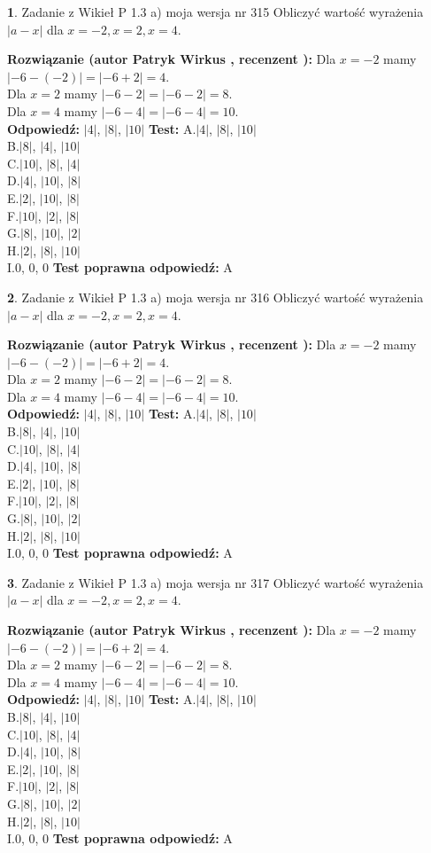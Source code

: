 \documentclass[12pt, a4paper]{article}
\theoremstyle{definition} %
\newtheorem{zad}{}
\newcommand{\zadStart}[1]{\begin{zad}#1\newline}
\newcommand{\zadStop}{\end{zad}}
\newcommand{\rozwStart}[2]{\noindent \textbf{Rozwiązanie (autor #1 , recenzent #2): }\newline}
\newcommand{\rozwStop}{\newline}
\newcommand{\odpStart}{\noindent \textbf{Odpowiedź:}\newline}
\newcommand{\odpStop}{\newline}
\newcommand{\testStart}{\noindent \textbf{Test:}\newline}
\newcommand{\testStop}{\newline}
\newcommand{\kluczStart}{\noindent \textbf{Test poprawna odpowiedź:}\newline}
\newcommand{\kluczStop}{\newline}
\begin{document}
\zadStart{Zadanie z Wikieł P 1.3 a) moja wersja nr 315}
Obliczyć wartość wyrażenia $|a - x|$ dla $x=-2,x=2,x=4$.
\zadStop
\rozwStart{Patryk Wirkus}{}
Dla $x = -2$ mamy $|-6 - (-2)| = |-6 + 2| = 4$.\\
Dla $x = 2$ mamy $|-6 - 2| = |-6 - 2| = 8$.\\
Dla $x = 4$ mamy $|-6 - 4| = |-6 - 4| = 10$.\\
\rozwStop
\odpStart
$|4|$, $|8|$, $|10|$
\odpStop
\testStart
A.$|4|$, $|8|$, $|10|$\\
B.$|8|$, $|4|$, $|10|$\\
C.$|10|$, $|8|$, $|4|$\\
D.$|4|$, $|10|$, $|8|$\\
E.$|2|$, $|10|$, $|8|$\\
F.$|10|$, $|2|$, $|8|$\\
G.$|8|$, $|10|$, $|2|$\\
H.$|2|$, $|8|$, $|10|$\\
I.$0$, $0$, $0$
\testStop
\kluczStart
A
\kluczStop



\zadStart{Zadanie z Wikieł P 1.3 a) moja wersja nr 316}
Obliczyć wartość wyrażenia $|a - x|$ dla $x=-2,x=2,x=4$.
\zadStop
\rozwStart{Patryk Wirkus}{}
Dla $x = -2$ mamy $|-6 - (-2)| = |-6 + 2| = 4$.\\
Dla $x = 2$ mamy $|-6 - 2| = |-6 - 2| = 8$.\\
Dla $x = 4$ mamy $|-6 - 4| = |-6 - 4| = 10$.\\
\rozwStop
\odpStart
$|4|$, $|8|$, $|10|$
\odpStop
\testStart
A.$|4|$, $|8|$, $|10|$\\
B.$|8|$, $|4|$, $|10|$\\
C.$|10|$, $|8|$, $|4|$\\
D.$|4|$, $|10|$, $|8|$\\
E.$|2|$, $|10|$, $|8|$\\
F.$|10|$, $|2|$, $|8|$\\
G.$|8|$, $|10|$, $|2|$\\
H.$|2|$, $|8|$, $|10|$\\
I.$0$, $0$, $0$
\testStop
\kluczStart
A
\kluczStop



\zadStart{Zadanie z Wikieł P 1.3 a) moja wersja nr 317}
Obliczyć wartość wyrażenia $|a - x|$ dla $x=-2,x=2,x=4$.
\zadStop
\rozwStart{Patryk Wirkus}{}
Dla $x = -2$ mamy $|-6 - (-2)| = |-6 + 2| = 4$.\\
Dla $x = 2$ mamy $|-6 - 2| = |-6 - 2| = 8$.\\
Dla $x = 4$ mamy $|-6 - 4| = |-6 - 4| = 10$.\\
\rozwStop
\odpStart
$|4|$, $|8|$, $|10|$
\odpStop
\testStart
A.$|4|$, $|8|$, $|10|$\\
B.$|8|$, $|4|$, $|10|$\\
C.$|10|$, $|8|$, $|4|$\\
D.$|4|$, $|10|$, $|8|$\\
E.$|2|$, $|10|$, $|8|$\\
F.$|10|$, $|2|$, $|8|$\\
G.$|8|$, $|10|$, $|2|$\\
H.$|2|$, $|8|$, $|10|$\\
I.$0$, $0$, $0$
\testStop
\kluczStart
A
\kluczStop
\end{document}
